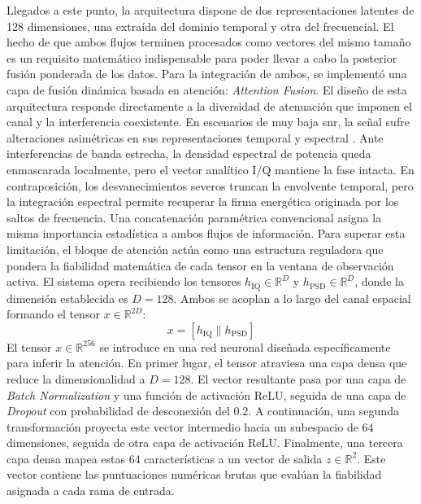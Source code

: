 Llegados a este punto, la arquitectura dispone de dos representaciones latentes de 128 dimensiones, una extraída del dominio temporal y otra del frecuencial. El hecho de que ambos flujos terminen procesados como vectores del mismo tamaño es un requisito matemático indispensable para poder llevar a cabo la posterior fusión ponderada de los datos.
Para la integración de ambos, se implementó una capa de fusión dinámica basada en atención: \textit{Attention Fusion}. El diseño de esta arquitectura responde directamente a la diversidad de atenuación que imponen el canal y la interferencia coexistente. En escenarios de muy baja \gls{snr}, la señal sufre alteraciones asimétricas en sus representaciones temporal y espectral \cite{gluge_robust_2024, lacy_machine_2024}. Ante interferencias de banda estrecha, la densidad espectral de potencia queda enmascarada localmente, pero el vector analítico I/Q mantiene la fase intacta. En contraposición, los desvanecimientos severos truncan la envolvente temporal, pero la integración espectral permite recuperar la firma energética originada por los saltos de frecuencia.
Una concatenación paramétrica convencional asigna la misma importancia estadística a ambos flujos de información. Para superar esta limitación, el bloque de atención actúa como una estructura reguladora que pondera la fiabilidad matemática de cada tensor en la ventana de observación activa. El sistema opera recibiendo los tensores $h_{\text{IQ}} \in \mathbb{R}^{D}$ y $h_{\text{PSD}} \in \mathbb{R}^{D}$, donde la dimensión establecida es $D=128$. Ambos se acoplan a lo largo del canal espacial formando el tensor $x \in \mathbb{R}^{2D}$:
\begin{equation}
    x = \left[ h_{\text{IQ}} \parallel h_{\text{PSD}} \right]
\end{equation}
El tensor $x \in \mathbb{R}^{256}$ se introduce en una red neuronal diseñada específicamente para inferir la atención. En primer lugar, el tensor atraviesa una capa densa que reduce la dimensionalidad a $D=128$. El vector resultante pasa por una capa de \textit{Batch Normalization} y una función de activación ReLU, seguida de una capa de \textit{Dropout} con probabilidad de desconexión del $0.2$. A continuación, una segunda transformación proyecta este vector intermedio hacia un subespacio de $64$ dimensiones, seguida de otra capa de activación ReLU. Finalmente, una tercera capa densa mapea estas $64$ características a un vector de salida $z \in \mathbb{R}^{2}$. Este vector contiene las puntuaciones numéricas brutas que evalúan la fiabilidad asignada a cada rama de entrada.
